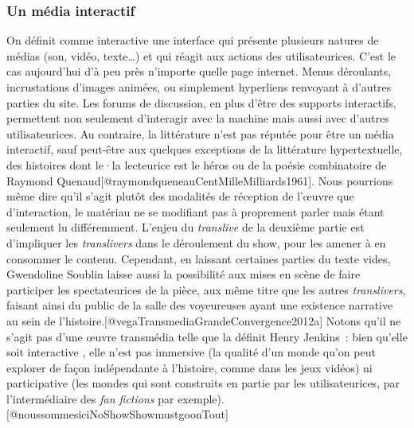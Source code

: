 \documentclass[
]{article}
\begin{document}
\subsubsection{Un média interactif}\label{un-muxe9dia-interactif}

On définit comme interactive une interface qui présente plusieurs natures de médias (son, vidéo, texte\ldots) et qui réagit aux actions des utilisateurices. C'est le cas aujourd'hui d'à peu près n'importe quelle page internet. Menus déroulants, incrustations d'images animées, ou simplement hyperliens renvoyant à d'autres parties du site. Les forums de discussion, en plus d'être des supports interactifs, permettent non seulement d'interagir avec la machine mais aussi avec d'autres utilisateurices. Au contraire, la littérature n'est pas réputée pour être un média interactif, sauf peut-être aux quelques exceptions de la littérature hypertextuelle, des histoires dont le·la lecteurice est le héros ou de la poésie combinatoire de Raymond Quenaud{[}@raymondqueneauCentMilleMilliards1961{]}. Nous pourrions même dire qu'il s'agit plutôt des modalités de réception de l'œuvre que d'interaction, le matériau ne se modifiant pas à proprement parler mais étant seulement lu différemment. L'enjeu du \emph{translive} de la deuxième partie est d'impliquer les \emph{translivers} dans le déroulement du show, pour les amener à en consommer le contenu. Cependant, en laissant certaines parties du texte vides, Gwendoline Soublin laisse aussi la possibilité aux mises en scène de faire participer les spectateurices de la pièce, aux même titre que les autres \emph{translivers}, faisant ainsi du public de la salle des voyeureuses ayant une existence narrative au sein de l'histoire.{[}@vegaTransmediaGrandeConvergence2012a{]} Notons qu'il ne s'agit pas d'une œuvre transmédia telle que la définit Henry Jenkins~: bien qu'elle soit interactive , elle n'est pas immersive (la qualité d'un monde qu'on peut explorer de façon indépendante à l'histoire, comme dans les jeux vidéos) ni participative (les mondes qui sont construits en partie par les utilisateurices, par l'intermédiaire des \emph{fan fictions} par exemple).{[}@noussommesiciNoShowShowmustgoonTout{]}
\end{document}
